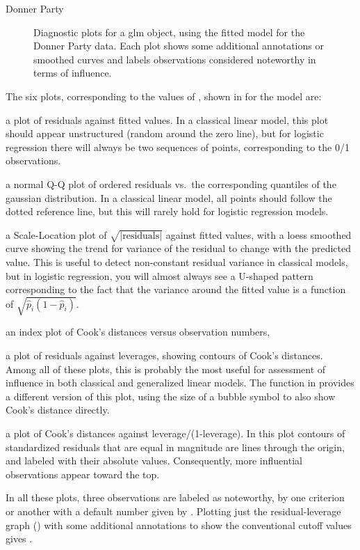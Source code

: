 \documentclass[11pt]{book}
\renewenvironment{knitrout}{\small\renewcommand{\baselinestretch}{.85}}{} %
\begin{document}
\begin{Example}[donner2]{Donner Party}
\begin{knitrout}
\begin{figure}[!htbp]
\caption[Diagnostic plots for a glm object, using the fitted model donner.mod3 for the Donner Party data.]{Diagnostic plots for a glm object, using the fitted model  for the Donner Party data. Each plot shows some additional annotations or smoothed curves and labels observations considered noteworthy in terms of influence.\label{fig:donner2-plot}}
\end{figure}


\end{knitrout}
The six plots, corresponding to the values of , shown in  for the  model are:
\begin{enumerate*}
\item a plot of residuals against fitted values.  In a classical linear model, this plot
should appear unstructured (random around the zero line), but for logistic regression
there will always be two sequences of points, corresponding to the 0/1 observations.
\item a normal Q-Q plot of ordered residuals vs.\ the corresponding quantiles of the gaussian distribution. In a classical linear model, all points should follow the dotted reference line,
but this will rarely hold for logistic regression models.
\item a Scale-Location plot of $\sqrt{|\mbox{residuals}|}$ against fitted values,
with a loess smoothed curve showing the trend for variance of the residual to
change with the predicted value.  This is useful to detect non-constant residual
variance in classical models, but in logistic regression, you will almost always
see a U-shaped pattern corresponding to the fact that the variance around the
fitted value is a function of $\sqrt{\hat{p}_i (1-\hat{p}_i)} $.
\item an index plot of Cook's distances versus observation numbers, 
\item a plot of residuals against leverages, showing contours of Cook's distances.  
Among all of these plots, this is probably the most useful for assessment of
influence in both classical and generalized linear models.  The function
 in  provides a different version of this plot,
using the size of a bubble symbol to also show Cook's distance directly.
\item a plot of Cook's distances against leverage/(1-leverage).
In this plot contours of standardized residuals that are equal in magnitude are lines through the origin,
and labeled with their absolute values. Consequently, more influential observations appear toward the top.
\end{enumerate*}
In all these plots, three observations are labeled as noteworthy, by one criterion or another
with a default number given by . Plotting just the residual-leverage graph
() with some additional annotations to show the conventional cutoff values
gives .


\end{Example}
\end{document}
